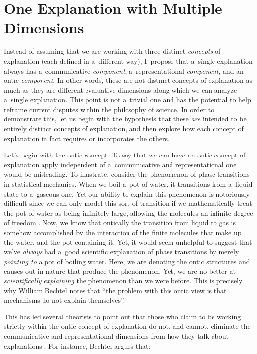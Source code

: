\section{One Explanation with Multiple Dimensions}
Instead of assuming that we are working with three distinct \textit{concepts} of explanation (each defined in a~different way), I~propose that a~single explanation always has a~communicative \textit{component}, a~representational \textit{component}, and an ontic \textit{component}. In other words, these are not distinct concepts of explanation as much as they are different evaluative dimensions along which we can analyze a~single explanation. This point is not a~trivial one and has the potential to help reframe current disputes within the philosophy of science. In order to demonstrate this, let us begin with the hypothesis that these \textit{are} intended to be entirely distinct concepts of explanation, and then explore how each concept of explanation in fact requires or incorporates the others.

Let's begin with the ontic concept. To say that we can have an ontic concept of explanation apply independent of a~communicative and representational one would be misleading. To illustrate, consider the phenomenon of phase transitions in statistical mechanics. When we boil a~pot of water, it transitions from a~liquid state to a~gaseous one. Yet our ability to explain this phenomenon is notoriously difficult since we can only model this sort of transition if we mathematically treat the pot of water as being infinitely large, allowing the molecules an infinite degree of freedom
\parencite[][]{batterman_devil_2002}. %
 Now, we know that ontically the transition from liquid to gas is somehow accomplished by the interaction of the finite molecules that make up the water, and the pot containing it. Yet, it would seem unhelpful to suggest that we've \textit{always} had a~good scientific explanation of phase transitions by merely \textit{pointing to} a pot of boiling water. Here, we are denoting the ontic structures and causes out in nature that produce the phenomenon. Yet, we are no better at \textit{scientifically} \textit{explaining} the phenomenon than we were before. This is precisely why William Bechtel 
\parencite*[][p.18]{bechtel_mental_2008} %
 notes that ``the problem with this ontic view is that mechanisms do not explain themselves''.

This has led several theorists to point out that those who claim to be working strictly within the ontic concept of explanation do not, and cannot, eliminate the communicative and representational dimensions from how they talk about explanations
\parencites[][p.18]{bechtel_mental_2008}[][]{wright_ontic_2015}[][]{bokulich_representing_2018}. %
 For instance, Bechtel argues that:


